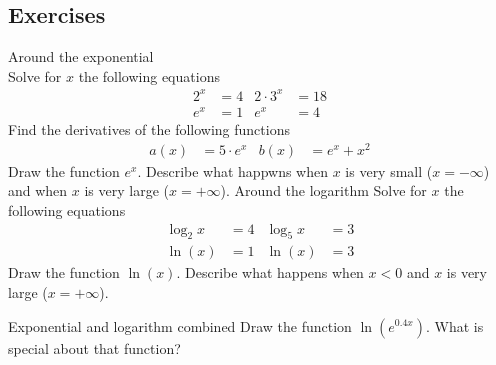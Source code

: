\documentclass[a4paper]{report}
\begin{document}
\subsection{Exercises}
\begin{Exercise}[title= Answer the following questions,label=exexln,difficulty=1]
\Question Around the exponential\\ 
\subQuestion Solve for $x$ the following equations
\begin{align*}
2^x &= 4			&  2\cdot 3^x&=18 \\
e^x &= 1			&  e^x&=4
\end{align*}
\subQuestion Find the derivatives of the following functions
\begin{align*}
a(x) &= 5\cdot e^x			&  b(x)&=e^x + x^2 
\end{align*}
\subQuestion Draw the function $e^x$. Describe what happwns when $x$ is very small ($x=- \infty$) and when $x$ is very large ($x=+\infty$).
\Question Around the logarithm
\subQuestion Solve for $x$ the following equations
\begin{align*}
\log_2{x} &= 4			& \log_5{x} &=3 \\
\ln(x) &= 1			&  \ln(x)&=3
\end{align*}
\subQuestion Draw the function $\ln(x)$. Describe what happens when $x<0$ and $x$ is very large ($x=+\infty$).
 
\Question Exponential and logarithm combined
\subQuestion Draw the function $\ln(e^{0.4x})$.
\subQuestion What is special about that function?
\end{Exercise}
\end{document}
